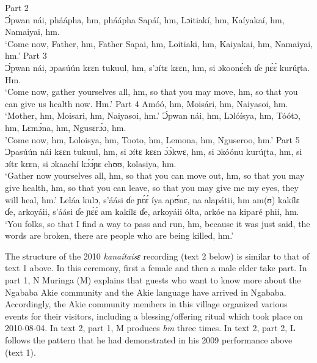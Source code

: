 \documentclass[output=paper,colorlinks,citecolor=brown]{langscibook}
\begin{document}

\ex   Part 2\\
      Ɔ́pwan nái, pháápha, hm, pháápha Sapáí, hm, Lɔitiakí, hm, Kaíyakaí, hm, Namaiyai, hm.\\
      `Come now, Father, hm, Father Sapai, hm, Loitiaki, hm, Kaiyakai, hm, Namaiyai, hm.'
\ex   Part 3\\
      Ɔ́pwan nái, ɔpasúún kɛɛn tukuul, hm, s’ɔítɛ kɛɛn, hm, si ɔkoonɛ́ch ɗe ɲɛ́ɛ́ kurúɽta. Hm.\\
      `Come now, gather yourselves all, hm, so that you may move, hm, so that you can  give us health now. Hm.'
\ex   Part 4
      \ea Amóó, hm, Moisári, hm, Naiyasoi, hm.\\
          `Mother, hm, Moisari, hm, Naiyasoi, hm.'
      \ex Ɔ́pwan nái, hm, Lɔlóísya, hm, Tóótɔ, hm, Lɛmɔ́na, hm, Ngusɛrɔ́ɔ, hm.\\
          'Come now, hm, Loloisya, hm, Tooto, hm, Lemona, hm, Nguseroo, hm.'
      \z
\pagebreak\ex   Part 5
    \ea Ɔpasúún nái kɛɛn tukuul, hm, si ɔítɛ kɛɛn ɔ́ɔ́kwɛ, hm, si ɔkóónu kurúɽta, hm, si ɔítɛ kɛɛn, si ɔkaachí kɔ́ɔ́ɲɛ chʊʊ, kolasiya, hm.\\
        `Gather now yourselves all, hm, so that you can move out, hm, so that you may give health, hm, so that you can leave, so that you may give me my eyes, they will heal, hm.'
    \ex Leláa kulɔ, s’áási ɗe ɲɛ́ɛ́ íya apʊ́nɛ, na alapátii, hm am(ʊ) kakílɛ ɗe, arkoyáii, s’áási ɗe ɲɛ́ɛ́ am kakílɛ ɗe, arkoyáii ólta, arkóe na kiparé phii, hm.\\
        `You folks, so that I find a way to pass and run, hm, because it was just said, the words are broken, there are people who are being killed, hm.'
    \z
\z

The structure of the 2010 \textit{kanaítaísɛ }recording (text 2 below) is similar to that of text 1 above. In this ceremony, first a female and then a male elder take part. In part 1, N Muringa (M) explains that guests who want to know more about the Ngababa Akie community and the Akie language have arrived in Ngababa. Accordingly, the Akie community members in this village organized various events for their visitors, including a blessing/offering ritual which took place on 2010-08-04. 
In text 2, part 1, M produces \textit{hm} three times. In text 2, part 2, L follows the pattern that he had demonstrated in his 2009 performance above (text 1).

\end{document}
